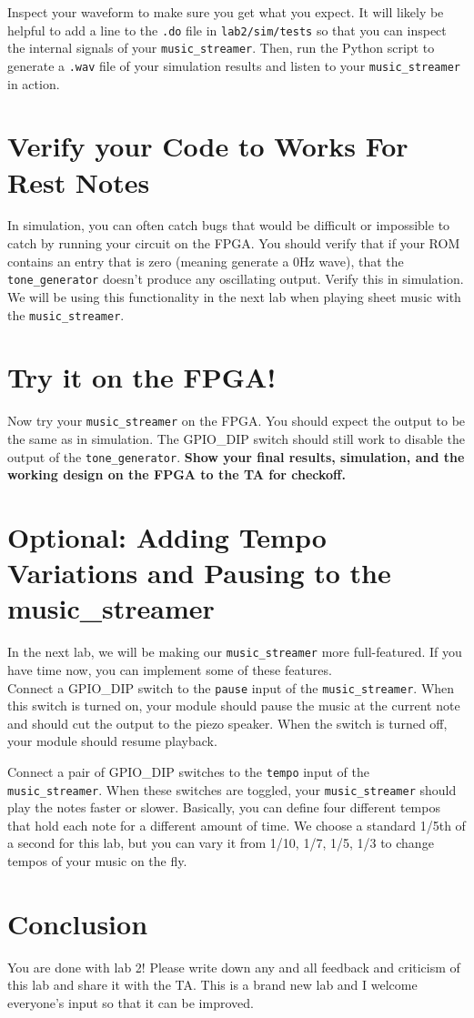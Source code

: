 \documentclass[11pt]{article}
\begin{document}
Inspect your waveform to make sure you get what you expect. It will likely be helpful to add a line to the \verb|.do| file in \verb|lab2/sim/tests| so that you can inspect the internal signals of your \verb|music_streamer|. Then, run the Python script to generate a \verb|.wav| file of your simulation results and listen to your \verb|music_streamer| in action.

\section{Verify your Code to Works For Rest Notes}
In simulation, you can often catch bugs that would be difficult or impossible to catch by running your circuit on the FPGA. You should verify that if your ROM contains an entry that is zero (meaning generate a 0Hz wave), that the \verb|tone_generator| doesn't produce any oscillating output. Verify this in simulation. We will be using this functionality in the next lab when playing sheet music with the \verb|music_streamer|.

\section{Try it on the FPGA!}
Now try your \verb|music_streamer| on the FPGA. You should expect the output to be the same as in simulation. The GPIO\_DIP switch should still work to disable the output of the \verb|tone_generator|. \textbf{Show your final results, simulation, and the working design on the FPGA to the TA for checkoff.}

\section{Optional: Adding Tempo Variations and Pausing to the music\_streamer}
In the next lab, we will be making our \verb|music_streamer| more full-featured. If you have time now, you can implement some of these features.\\

Connect a GPIO\_DIP switch to the \verb|pause| input of the \verb|music_streamer|. When this switch is turned on, your module should pause the music at the current note and should cut the output to the piezo speaker. When the switch is turned off, your module should resume playback.

Connect a pair of GPIO\_DIP switches to the \verb|tempo| input of the \verb|music_streamer|. When these switches are toggled, your \verb|music_streamer| should play the notes faster or slower. Basically, you can define four different tempos that hold each note for a different amount of time. We choose a standard 1/5th of a second for this lab, but you can vary it from 1/10, 1/7, 1/5, 1/3 to change tempos of your music on the fly.

\section{Conclusion}
You are done with lab 2! Please write down any and all feedback and criticism of this lab and share it with the TA. This is a brand new lab and I welcome everyone's input so that it can be improved.
\end{document}
